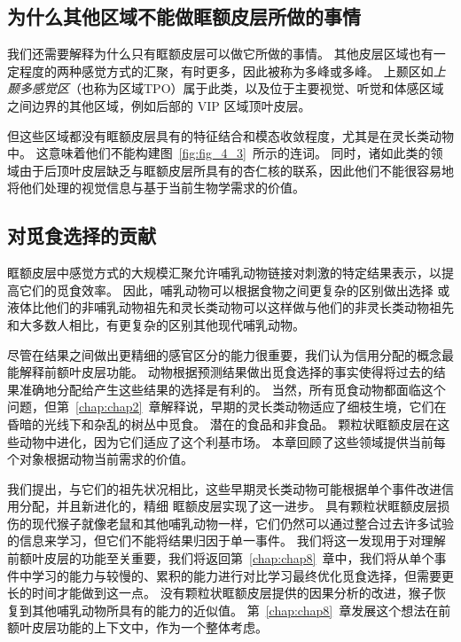 \subsection{为什么其他区域不能做眶额皮层所做的事情}

我们还需要解释为什么只有眶额皮层可以做它所做的事情。 
其他皮层区域也有一定程度的两种感觉方式的汇聚，有时更多，因此被称为多峰或多峰。
上颞区如\textit{上颞多感觉区}（也称为区域TPO）属于此类\cite{seltzer1994parietal}，以及位于主要视觉、听觉和体感区域之间边界的其他区域，例如后部的 VIP 区域顶叶皮层\cite{schlack2005multisensory}。\par


但这些区域都没有眶额皮层具有的特征结合和模态收敛程度，尤其是在灵长类动物中。
这意味着他们不能构建图~\ref{fig:fig_4_3}~所示的连词。
同时，诸如此类的领域由于后顶叶皮层缺乏与眶额皮层所具有的杏仁核的联系，因此他们不能很容易地将他们处理的视觉信息与基于当前生物学需求的价值。\par



\subsection{对觅食选择的贡献}

眶额皮层中感觉方式的大规模汇聚允许哺乳动物链接对刺激的特定结果表示，以提高它们的觅食效率。
因此，哺乳动物可以根据食物之间更复杂的区别做出选择
或液体比他们的非哺乳动物祖先和灵长类动物可以这样做与他们的非灵长类动物祖先和大多数人相比，有更复杂的区别其他现代哺乳动物。\par


尽管在结果之间做出更精细的感官区分的能力很重要，我们认为信用分配的概念最能解释前额叶皮层功能。
动物根据预测结果做出觅食选择的事实使得将过去的结果准确地分配给产生这些结果的选择是有利的。
当然，所有觅食动物都面临这个问题，但第~\ref{chap:chap2}~章解释说，早期的灵长类动物适应了细枝生境，它们在昏暗的光线下和杂乱的树丛中觅食。
潜在的食品和非食品。
颗粒状眶额皮层在这些动物中进化，因为它们适应了这个利基市场。
本章回顾了这些领域提供当前每个对象根据动物当前需求的价值。\par


我们提出，与它们的祖先状况相比，这些早期灵长类动物可能根据单个事件改进信用分配，并且新进化的，精细 眶额皮层实现了这一进步。
具有颗粒状眶额皮层损伤的现代猴子就像老鼠和其他哺乳动物一样，它们仍然可以通过整合过去许多试验的信息来学习，但它们不能将结果归因于单一事件。
我们将这一发现用于对理解前额叶皮层的功能至关重要，我们将返回第~\ref{chap:chap8}~章中，我们将从单个事件中学习的能力与较慢的、累积的能力进行对比学习最终优化觅食选择，但需要更长的时间才能做到这一点。
没有颗粒状眶额皮层提供的因果分析的改进，猴子恢复到其他哺乳动物所具有的能力的近似值。
第~\ref{chap:chap8}~章发展这个想法在前额叶皮层功能的上下文中，作为一个整体考虑。\par


